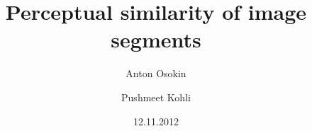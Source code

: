 \documentclass{beamer}
\title{Perceptual similarity of image segments}
\author
{Anton Osokin \and Pushmeet Kohli}
\date{12.11.2012}
\begin{document}
\frame{\titlepage}


 
\end{document}
